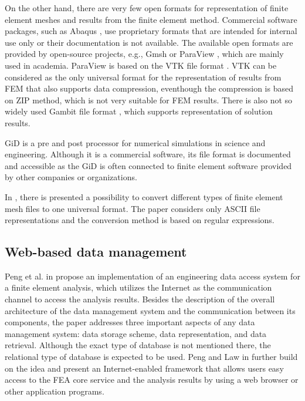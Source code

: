 

On the other hand, there are very few open formats for representation of finite element meshes and results from the finite element method. Commercial software packages, such as Abaqus \cite{Abaqus}, use proprietary formats that are intended for internal use only or their documentation is not available. The available open formats are provided by open-source projects, e.g., Gmsh \cite{Geuzaine2009} or ParaView \cite{ParaView2005}, which are mainly used in academia. ParaView is based on the VTK file format \cite{VTK2015}. VTK can be considered as the only universal format for the representation of results from FEM that also supports data compression, eventhough the compression is based on ZIP method, which is not very suitable for FEM results. There is also not so widely used Gambit file format \cite{GAMBIT}, which supports representation of solution results.

GiD \cite{GiDWeb} is a pre and post processor for numerical simulations in science and engineering. Although it is a commercial software, its file format is documented \cite{GiDPostProcess} and accessible as the GiD is often connected to finite element software provided by other companies or organizations.

In \cite{Ivanyi2012}, there is presented a possibility to convert different types of finite element mesh files to one universal format. The paper considers only ASCII file representations and the conversion method is based on regular expressions.


\subsection{Web-based data management}

Peng et al. in \cite{Peng2003} propose an implementation of an engineering data access system for a finite element analysis, which utilizes the Internet as the communication channel to access the analysis results. Besides the description of the overall architecture of the data management system and the communication between its components, the paper addresses three important aspects of any data management system: data storage scheme, data representation, and data retrieval. Although the exact type of database is not mentioned there, the relational type of database is expected to be used. Peng and Law in \cite{Peng2004} further build on the idea and present an Internet-enabled framework that allows users easy access to the FEA core service and the analysis results by using a web browser or other application programs.

